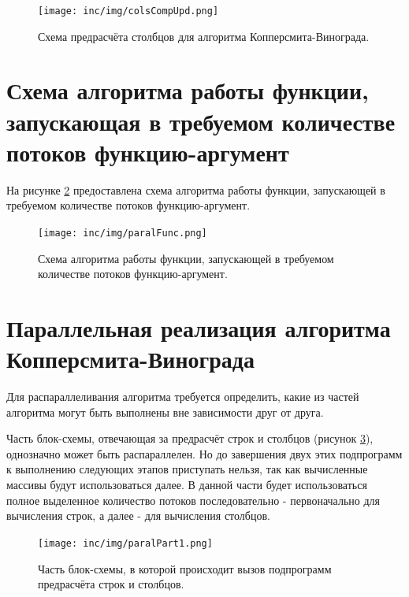 \documentclass[12pt]{report}
\begin{document}
\begin{figure}
\begin{center}
\texttt{[image: inc/img/colsCompUpd.png]}
\captionsetup{justification=centering}
	\caption{Схема предрасчёта столбцов для алгоритма Копперсмита-Винограда.}
	\label{img:colsPreComp}	
\end{center}
\end{figure}
\newpage

\section{Схема алгоритма работы функции, запускающая в требуемом количестве потоков функцию-аргумент}
На рисунке \ref{img:paralFuck} предоставлена схема алгоритма работы функции, запускающей в требуемом количестве потоков функцию-аргумент.

\begin{figure}
\begin{center}
\texttt{[image: inc/img/paralFunc.png]}
\captionsetup{justification=centering}
	\caption{Схема алгоритма работы функции, запускающей в требуемом количестве потоков функцию-аргумент.}
	\label{img:paralFuck}	
\end{center}
\end{figure}

\section{Параллельная реализация алгоритма Копперсмита-Винограда}
Для распараллеливания алгоритма требуется определить, какие из частей алгоритма могут быть выполнены вне зависимости друг от друга.

Часть блок-схемы, отвечающая за предрасчёт строк и столбцов (рисунок \ref{img:paralPart1}), однозначно может быть распараллелен. Но до завершения двух этих подпрограмм к выполнению следующих этапов приступать нельзя, так как вычисленные массивы будут использоваться далее. В данной части будет использоваться полное выделенное количество потоков последовательно - первоначально для вычисления строк, а далее - для вычисления столбцов.
\begin{figure}
\begin{center}
\texttt{[image: inc/img/paralPart1.png]}
\captionsetup{justification=centering}
	\caption{Часть блок-схемы, в которой происходит вызов подпрограмм предрасчёта строк и столбцов.}
	\label{img:paralPart1}	
\end{center}
\end{figure}
\newpage
\end{document}
